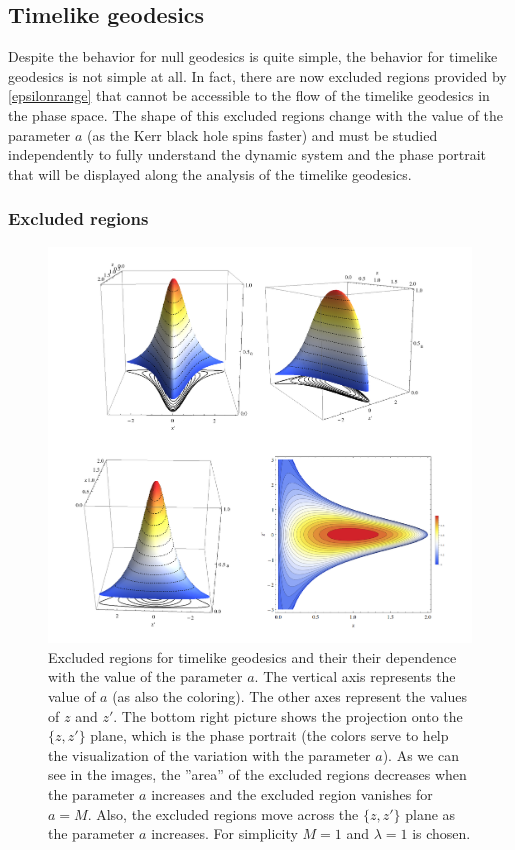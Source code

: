 \subsection{Timelike geodesics}

Despite the behavior for null geodesics is quite simple, the behavior for timelike geodesics is not simple at all. In fact,  there are now excluded regions provided by \cref{epsilonrange} that cannot be accessible to the flow of the timelike geodesics in the phase space. The shape of this excluded regions change with the value of the parameter $a$ (as the Kerr black hole spins faster) and must be studied independently to fully understand the dynamic system and the phase portrait that will be displayed along the analysis of the timelike geodesics.
\FloatBarrier
\subsubsection{Excluded regions}\label{excludedreg}
 \begin{figure}[htp!]
\begin{center}
 \centerline{\includegraphics[width=\textwidth]{img/Chapter3/Excluded.png}}
 \end{center}
 \caption{Excluded regions for timelike geodesics and their their dependence with the value of the parameter $a$. The vertical axis represents the value of $a$ (as also the coloring). The other axes represent the values of $z$ and $z'$. The bottom right picture shows the projection onto the $\{z,z'\}$ plane, which is the phase portrait (the colors serve to help the visualization of the variation with the parameter $a$). As we can see in the images, the ''area'' of the excluded regions decreases when the parameter $a$ increases and the excluded region vanishes for $a=M$. Also, the excluded regions move across the $\{z,z'\}$ plane as the parameter $a$ increases. For simplicity $M=1$ and $\lambda=1$ is chosen.}
 \label{fig:Excluded}
\end{figure} 
